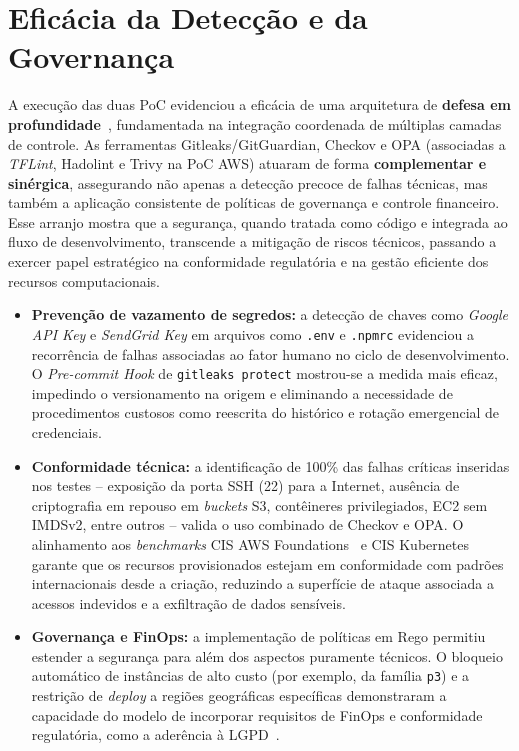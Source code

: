 \section{Eficácia da Detecção e da Governança}

A execução das duas PoC evidenciou a eficácia de uma arquitetura de \textbf{defesa em profundidade}~, fundamentada na integração coordenada de múltiplas camadas de controle. As ferramentas Gitleaks/GitGuardian, Checkov e OPA (associadas a \textit{TFLint}, Hadolint e Trivy na PoC AWS) atuaram de forma \textbf{complementar e sinérgica}, assegurando não apenas a detecção precoce de falhas técnicas, mas também a aplicação consistente de políticas de governança e controle financeiro. Esse arranjo mostra que a segurança, quando tratada como código e integrada ao fluxo de desenvolvimento, transcende a mitigação de riscos técnicos, passando a exercer papel estratégico na conformidade regulatória e na gestão eficiente dos recursos computacionais.

\begin{itemize}
    \item \textbf{Prevenção de vazamento de segredos:} a detecção de chaves como \textit{Google API Key} e \textit{SendGrid Key} em arquivos como \texttt{.env} e \texttt{.npmrc} evidenciou a recorrência de falhas associadas ao fator humano no ciclo de desenvolvimento. O \textit{Pre-commit Hook} de \texttt{gitleaks protect} mostrou-se a medida mais eficaz, impedindo o versionamento na origem e eliminando a necessidade de procedimentos custosos como reescrita do histórico e rotação emergencial de credenciais.

    \item \textbf{Conformidade técnica:} a identificação de 100\% das falhas críticas inseridas nos testes -- exposição da porta SSH (22) para a Internet, ausência de criptografia em repouso em \textit{buckets} S3, contêineres privilegiados, EC2 sem IMDSv2, entre outros -- valida o uso combinado de Checkov e OPA. O alinhamento aos \textit{benchmarks} CIS AWS Foundations~ e CIS Kubernetes~ garante que os recursos provisionados estejam em conformidade com padrões internacionais desde a criação, reduzindo a superfície de ataque associada a acessos indevidos e a exfiltração de dados sensíveis.

    \item \textbf{Governança e FinOps:} a implementação de políticas em Rego permitiu estender a segurança para além dos aspectos puramente técnicos. O bloqueio automático de instâncias de alto custo (por exemplo, da família \texttt{p3}) e a restrição de \textit{deploy} a regiões geográficas específicas demonstraram a capacidade do modelo de incorporar requisitos de FinOps e conformidade regulatória, como a aderência à LGPD~.
\end{itemize}

